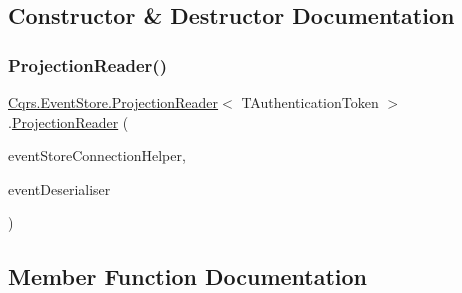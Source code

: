 \subsection{Constructor \& Destructor Documentation}
\mbox{\label{classCqrs_1_1EventStore_1_1ProjectionReader_a87d5f996f75577bb6ae18704c9a590a2_a87d5f996f75577bb6ae18704c9a590a2}} 
\subsubsection{\texorpdfstring{Projection\+Reader()}{ProjectionReader()}}
{\footnotesize\ttfamily \hyperlink{classCqrs_1_1EventStore_1_1ProjectionReader}{Cqrs.\+Event\+Store.\+Projection\+Reader}$<$ T\+Authentication\+Token $>$.\hyperlink{classCqrs_1_1EventStore_1_1ProjectionReader}{Projection\+Reader} (\begin{DoxyParamCaption}\item[{\hyperlink{interfaceCqrs_1_1EventStore_1_1IEventStoreConnectionHelper}{I\+Event\+Store\+Connection\+Helper}}]{event\+Store\+Connection\+Helper,  }\item[{\hyperlink{interfaceCqrs_1_1EventStore_1_1IEventDeserialiser}{I\+Event\+Deserialiser}$<$ T\+Authentication\+Token $>$}]{event\+Deserialiser }\end{DoxyParamCaption})\hspace{0.3cm}{\ttfamily [protected]}}



\subsection{Member Function Documentation}
\mbox{\label{classCqrs_1_1EventStore_1_1ProjectionReader_adcc229abde429acfa6b125b3a93a85b4_adcc229abde429acfa6b125b3a93a85b4}} 
